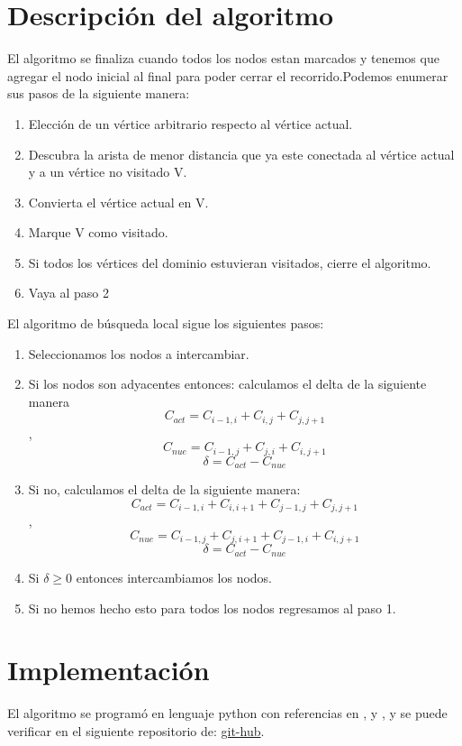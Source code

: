 \documentclass[12pt,a4paper]{article}
\begin{document}
\section{Descripción del algoritmo}
 El algoritmo se finaliza cuando todos los nodos estan marcados y tenemos que agregar el nodo inicial al final para poder cerrar el recorrido.Podemos enumerar sus pasos de la siguiente manera:
\begin{enumerate}
    \item Elección de un vértice arbitrario respecto al vértice actual.
    \item Descubra la arista de menor distancia que ya este conectada al vértice actual y a un vértice no visitado V.
    \item Convierta el vértice actual en V.
    \item Marque V como visitado.
    \item Si todos los vértices del dominio estuvieran visitados, cierre el algoritmo.
    \item Vaya al paso 2
\end{enumerate}
El algoritmo de búsqueda local sigue los siguientes pasos:
\begin{enumerate}
    \item Seleccionamos los nodos a intercambiar.
    \item Si los nodos son adyacentes entonces: calculamos el delta de la siguiente manera $$C_{act} = C_{i-1,i}+C_{i,j}+C_{j,j+1}$$, $$C_{nue} = C_{i-1,j}+C_{j,i}+C_{i,j+1}$$ $$\delta = C_{act} - C_{nue}$$
    \item Si no, calculamos el delta de la siguiente manera: $$C_{act} = C_{i-1,i}+C_{i,i+1}+C_{j-1,j}+C_{j,j+1}$$, $$C_{nue} = C_{i-1,j}+C_{j,i+1}+C_{j-1,i}+C_{i,j+1}$$ $$\delta = C_{act} - C_{nue}$$
    \item Si $\delta \geq 0$ entonces intercambiamos los nodos.
    \item Si no hemos hecho esto para todos los nodos regresamos al paso 1. 
\end{enumerate}
\section{Implementación} 
El algoritmo se programó en lenguaje python con referencias en \cite{van1991guia}, \cite{van2017tutorial} y \cite{chun2001core}, y se puede verificar en el siguiente repositorio de: \href{https://github.com/arnoldae9/PycharmProjects.git}{git-hub}.
\end{document}
